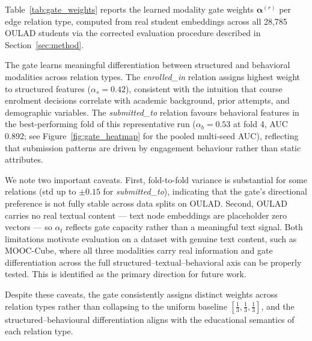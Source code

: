 \documentclass[sigconf,review]{acmart}
\begin{document}
Table~\ref{tab:gate_weights} reports the learned
modality gate weights $\boldsymbol{\alpha}^{(r)}$ per
edge relation type, computed from real student
embeddings across all 28,785 OULAD students via the
corrected evaluation procedure described in
Section~\ref{sec:method}.

The gate learns meaningful differentiation between
structured and behavioral modalities across relation
types. The \textit{enrolled\_in} relation assigns
highest weight to structured features
($\alpha_s = 0.42$), consistent with the intuition
that course enrolment decisions correlate with
academic background, prior attempts, and demographic
variables. The \textit{submitted\_to} relation
favours behavioral features in the best-performing
fold of this representative run ($\alpha_b = 0.53$
at fold 4, AUC 0.892; see Figure~\ref{fig:gate_heatmap}
for the pooled multi-seed AUC), reflecting that
submission patterns are driven by engagement
behaviour rather than static attributes.

We note two important caveats. First, fold-to-fold
variance is substantial for some relations
(std up to $\pm 0.15$ for \textit{submitted\_to}),
indicating that the gate's directional preference is
not fully stable across data splits on OULAD.
Second, OULAD carries no real textual content ---
text node embeddings are placeholder zero vectors ---
so $\alpha_t$ reflects gate capacity rather than a
meaningful text signal. Both limitations motivate
evaluation on a dataset with genuine text content,
such as MOOC-Cube, where all three modalities carry
real information and gate differentiation across the
full structured--textual--behavioral axis can be
properly tested. This is identified as the primary
direction for future work.

Despite these caveats, the gate consistently assigns
distinct weights across relation types rather than
collapsing to the uniform baseline
$[\frac{1}{3}, \frac{1}{3}, \frac{1}{3}]$, and the
structured--behavioural differentiation aligns with
the educational semantics of each relation type.
\end{document}

